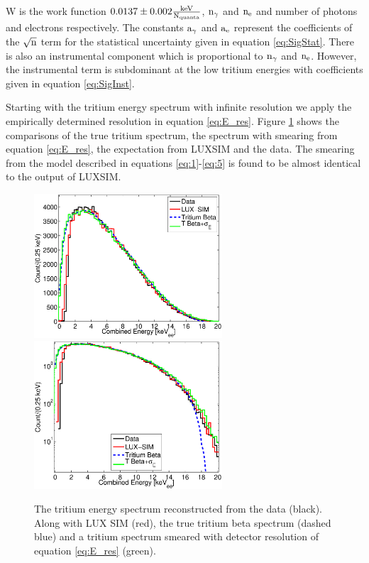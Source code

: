 \noindent W is the work function $0.0137\pm0.002 \rm \frac{keV}{N_{quanta}}$, $\rm n_\gamma$ and $\rm n_e$ and number of photons and electrons respectively. The constants $\rm a_\gamma$ and $\rm a_e$ represent the coefficients of the $\rm \sqrt{n}$ term for the statistical uncertainty given in equation \ref{eq:SigStat}. There is also an instrumental component which is proportional to $\rm n_\gamma$ and $\rm n_e$. However, the instrumental term is subdominant at the low tritium energies with coefficients given in equation \ref{eq:SigInst}.

Starting with the tritium energy spectrum with infinite resolution we apply the empirically determined resolution in equation \ref{eq:E_res}. Figure \ref{fig:E_spec} shows the comparisons of the true tritium spectrum, the spectrum with smearing from equation \ref{eq:E_res}, the expectation from LUXSIM and the data. The smearing from the model described in equations \ref{eq:1}-\ref{eq:5} is found to be almost identical to the output of LUXSIM.

\newpage

 \begin{figure}[h!]\centering
\includegraphics[width=70mm]{Chapter_Flucs/Figures/E_Spec/E_spec_compare_SIM.eps}
\includegraphics[width=70mm]{Chapter_Flucs/Figures/E_Spec/E_spec_compare_SIM_log_.eps}
\caption{The tritium energy spectrum reconstructed from the data (black). Along with LUX SIM (red), the true tritium beta spectrum (dashed blue) and a tritium spectrum smeared with detector resolution of equation \ref{eq:E_res} (green). }
\label{fig:E_spec}
\end{figure}

